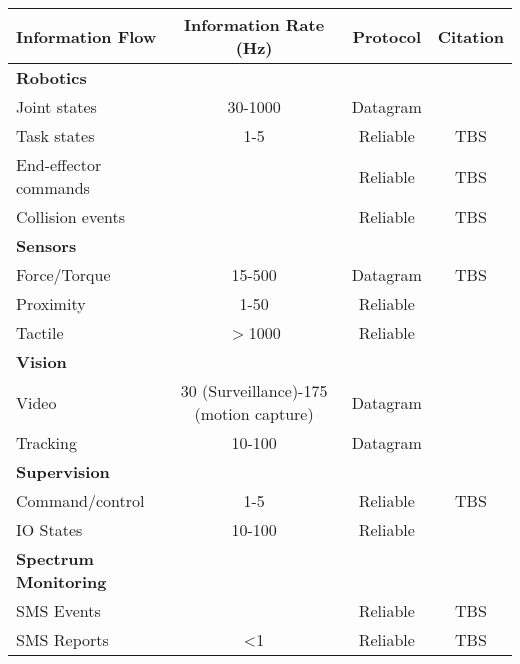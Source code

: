 \begin{tabular}{lccc}
\textbf{Information Flow} &
  \textbf{Information Rate (Hz)} &
  \textbf{Protocol} &
  \textbf{Citation}
  \\
\midrule
\textbf{Robotics} &
   &
    &
  
  \\
Joint states &
  30-1000 &
  Datagram &
  \cite{JMarvel2017}
  \\
Task states &
  1-5 &
  Reliable &
  TBS
  \\
End-effector commands &
  \tnote{*} &
  Reliable &
  TBS
  \\
Collision events &
  \tnote{*} &
  Reliable &
  TBS
  \\
\midrule
\textbf{Sensors} &
   &
    &
  
  \\
Force/Torque &
  15-500 &
  Datagram &
  TBS
  \\
Proximity &
  1-50 &
  Reliable &
  \cite{DiffuseSensorSpecs}
  \\
Tactile &
  $>$1000 &
  Reliable &
  \cite{TactileInternet}
  \\
\midrule
\textbf{Vision} &
   &
    &
  
  \\
Video &
  30 (Surveillance)-175 (motion capture) &
  Datagram &
  \cite{industrialCCTV, labOpticalCameraSpecs}
  \\
Tracking &
  10-100 &
  Datagram &
  \cite{LIDA15Hz}
  \\
\midrule
\textbf{Supervision} &
   &
   &
  
  \\
Command/control &
  1-5 &
  Reliable &
  TBS
  \\
IO States &
  10-100 &
  Reliable &
  \cite{TwinCAT}
  \\
\midrule
\textbf{Spectrum Monitoring} &
   &
   &
  
  \\
SMS Events &
  \tnote{*} &
  Reliable &
  TBS
  \\
SMS Reports &
  <1 &
  Reliable &
  TBS
  \\
\bottomrule
\end{tabular}%
